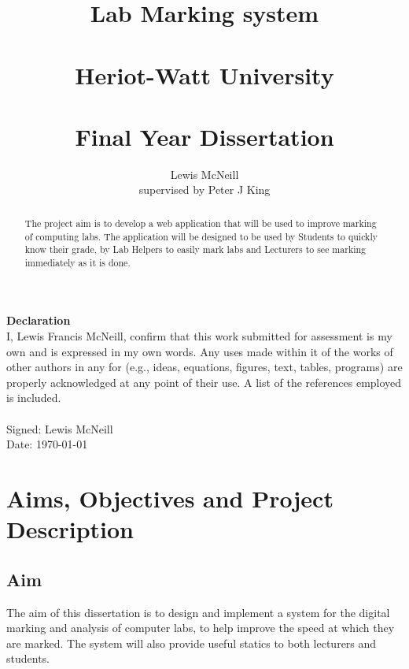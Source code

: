 \documentclass[12pt]{article}  %
\title{Lab Marking system \\~\\  \large{Heriot-Watt University} \\~\\ Final Year Dissertation}
\author{Lewis McNeill\\
supervised by
Peter J King}
\theoremstyle{definition}
\theoremstyle{remark}
\begin{document}
\maketitle
{}
\newpage 

\doublespacing
\textbf{\Large{Declaration}} \\[2em]
I, Lewis Francis McNeill, confirm that this work submitted for assessment is my own and is expressed in my own words. Any uses made within it of the works of other authors in any for (e.g., ideas, equations, figures, text, tables, programs) are properly acknowledged at any point of their use. A list of the references employed is included.
\\
\\
Signed: Lewis McNeill
\\
Date: \today

\newpage                    
\begin{abstract}

The project aim is to develop a web application that will be used to improve marking of computing labs. The application will be designed to be used by Students to quickly know their grade, by Lab Helpers to easily mark labs and Lecturers to see marking immediately as it is done.



\end{abstract}

\newpage                     

\singlespacing
\tableofcontents
\doublespacing



\newpage        
\section{Aims, Objectives and Project Description}
\setcounter{page}{1}

\subsection{Aim}
The aim of this dissertation is to design and implement a system for the digital marking and analysis of computer labs, to help improve the speed at which they are marked. The system will also provide useful statics to both lecturers and students.
\end{document}
